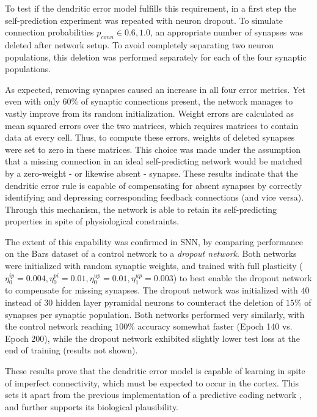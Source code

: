 To test if the dendritic error model fulfills this requirement, in a first step the self-prediction experiment was
repeated with neuron dropout. To simulate connection probabilities $p_{conn} \in {0.6, 1.0}$, an appropriate number of
synapses was deleted after network setup. To avoid completely separating two neuron populations, this deletion was
performed separately for each of the four synaptic populations.

As expected, removing synapses caused an increase in all four error metrics. Yet even with only 60\% of synaptic
connections present, the network manages to vastly improve from its random initialization. Weight errors are calculated
as mean squared errors over the two matrices, which requires matrices to contain data at every cell. Thus, to compute
these errors, weights of deleted synapses were set to zero in these matrices. This choice was made under the assumption
that a missing connection in an ideal self-predicting network would be matched by a zero-weight - or likewise absent -
synapse. These results indicate that the dendritic error rule is capable of compensating for absent synapses by
correctly identifying and depressing corresponding feedback connections (and vice versa). Through this mechanism, the
network is able to retain its self-predicting properties in spite of physiological constraints.


The extent of this capability was confirmed in SNN, by comparing performance on the Bars dataset of a control network to
a \textit{dropout network}. Both networks were initialized with random synaptic weights, and trained with full
plasticity ($\eta^{ip}_0 = 0.004, \eta^{pi}_0 = 0.01, \eta^{up}_0 = 0.01, \eta^{up}_1 = 0.003$) to best enable the
dropout network to compensate for missing synapses. The dropout network was initialized with $40$ instead of $30$ hidden
layer pyramidal neurons to counteract the deletion of $15\%$ of synapses per synaptic population. Both networks
performed very similarly, with the control network reaching $100\%$ accuracy somewhat faster (Epoch 140 vs. Epoch 200),
while the dropout network exhibited slightly lower test loss at the end of training (results not shown).

These results prove that the dendritic error model is capable of learning in spite of imperfect connectivity, which must
be expected to occur in the cortex. This sets it apart from the previous implementation of a predictive coding network
\citep{Whittington2017}, and further supports its biological plausibility.



